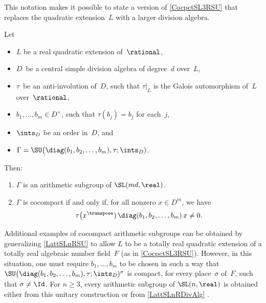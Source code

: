 This notation makes it possible to state a version of \cref{CocpctSL3RSU} that
replaces the quadratic extension~$L$ with a larger division algebra.

\begin{prop} \label{LattSLnRSU}
 Let
 \begin{itemize}
 \item $L$ be a real quadratic extension of\/~$\rational$,
 \item $D$~be a central simple division algebra of
degree~$d$ over~$L$,
 \item $\tau$~be an anti-involution of~$D$, such that
$\tau|_L$ is the Galois automorphism of~$L$ over~$\rational$,
 \item $b_1,\ldots,b_m \in D^\times$, such that $\tau(b_j)
= b_j$ for each~$j$,
 \item $\ints_D$ be an order in~$D$, 
 and
 \item $\Gamma = \SU \bigl( \diag(b_1,b_2,\ldots,b_m) , \tau ;
\ints_D)$. 
 \end{itemize}
 Then:
 \begin{enumerate}
 \item  $\Gamma$ is an arithmetic subgroup of\/
$\SL(md,\real)$.
 \item $\Gamma$ is cocompact if and only if, for all nonzero $x \in D^m$, we have
 $$\tau \bigl(x^\transpose) \, \diag(b_1,b_2,\ldots,b_m) \,
x \neq 0 .$$
 \end{enumerate}
 \end{prop}

Additional examples of cocompact arithmetic subgroups can be obtained
by generalizing \cref{LattSLnRSU} to allow $L$ to be a
totally real quadratic extension of a totally real
algebraic number field~$F$ (as in
\cref{CocpctSL3RSU}). However, in this situation, one
must require $b_1,\ldots,b_m$ to be chosen in such a
way that $\SU \bigl( \diag(b_1,b_2,\ldots,b_m), \tau ;
\ints_D)^\sigma$ is compact, for every
place~$\sigma$ of~$F$, such that $\sigma \neq \Id$. For $n
\ge 3$, every arithmetic subgroup of $\SL(n,\real)$ is
obtained either from this unitary construction or from
\cref{LattSLnRDivAlg} .

